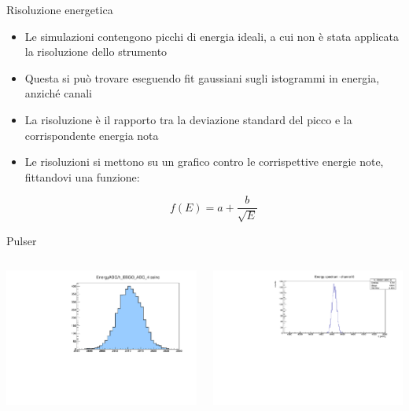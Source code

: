\documentclass [xcolor=svgnames] {beamer}
\begin{document}
\begin{frame}{Risoluzione energetica}%
		\begin{itemize}
				\item Le simulazioni contengono picchi di energia ideali, a cui non è stata applicata la risoluzione dello strumento
				\item Questa si può trovare eseguendo fit gaussiani sugli istogrammi in energia, anziché canali
				\item La risoluzione è il rapporto tra la deviazione standard del picco e la corrispondente energia nota
				\item Le risoluzioni si mettono su un grafico contro le corrispettive energie note, fittandovi una funzione:
				
				\begin{equation*}
						f(E) = a + \dfrac{b}{\sqrt{E}}
					\end{equation*}
			\end{itemize}
\end{frame}
\begin{frame}{Pulser}
	\begin{columns}
		\begin{column}{0.5\textwidth}
			\includegraphics[width=\textwidth]{img/run1776_coinc_h_EBGO_ADC_4_COINC.pdf}
		\end{column}
		\begin{column}{0.5\textwidth}
			\includegraphics[width=\textwidth]{img/pulser.pdf}
		\end{column}
	\end{columns}
\end{frame}
\end{document}
